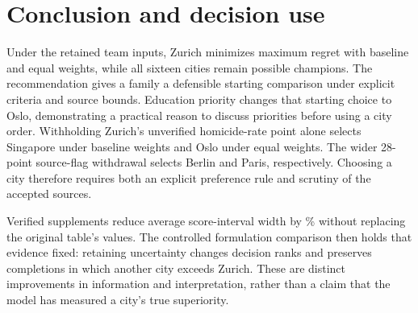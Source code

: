 \section{Conclusion and decision use}
Under the retained team inputs, Zurich minimizes maximum regret with baseline
and equal weights,
while all sixteen cities remain possible champions. The recommendation gives a
family a defensible starting comparison under explicit criteria and source
bounds. Education priority changes that starting choice to Oslo, demonstrating
a practical reason to discuss priorities before using a city order.
Withholding Zurich's unverified homicide-rate point alone selects Singapore
under baseline weights and Oslo under equal weights. The wider 28-point
source-flag withdrawal selects Berlin and Paris, respectively. Choosing a city therefore
requires both an explicit preference rule and scrutiny of the accepted sources.

Verified supplements reduce average score-interval width by \TotalWidthReduction\% without
replacing the original table's values. The controlled formulation comparison
then holds that evidence fixed: retaining uncertainty changes \RevisionRankChanges{} decision
ranks and preserves completions in which another city exceeds Zurich. These
are distinct improvements in information and interpretation, rather than a
claim that the model has measured a city's true superiority.
